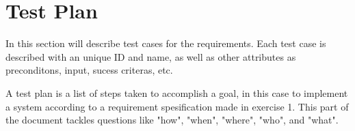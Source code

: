 \chapter{Test Plan}
	
	In this section will describe test cases for the requirements. 
	Each test case is described with an unique ID and name, as well as 
	other attributes as preconditons, input, sucess criteras, etc. 

	A test plan is a list of steps taken to accomplish a goal, in this case
	to implement a system according to a requirement spesification made in 
	exercise 1.	This part of the document tackles questions like "how", "when", 
	"where", "who", and "what". 


	\clearpage
	
	\clearpage
	
	\clearpage
	
	\clearpage
	